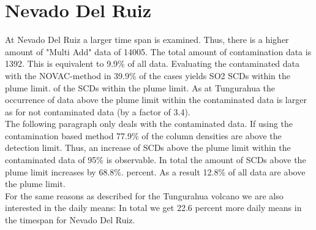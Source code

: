 \documentclass  [
  paper    = a4,
  BCOR     = 10mm,
  twoside,
  fontsize = 12pt,
  fleqn,
  toc      = bibnumbered,
  toc      = listofnumbered,
  numbers  = noendperiod,
  headings = normal,
  listof   = leveldown,
  version  = 3.03
]                                       {scrreprt}
\begin{document}
	


\section{Nevado Del Ruiz}
At Nevado Del Ruiz a larger time span is examined. Thus, there is a higher amount of "Multi Add" data of 14005.
The total amount of contamination data is 1392. This is equivalent to 9.9\% of all data. Evaluating the contaminated data with the NOVAC-method in 39.9\% of the cases yields SO2 SCDs within the plume limit. of the  SCDs within the plume limit. As at Tungurahua the occurrence of data above the plume limit within the contaminated data is larger as for not contaminated data (by a factor of 3.4).\\
The following paragraph only deals with the contaminated data.
If using the contamination based method 77.9\% of the  column densities are above the detection limit. Thus, an increase of  SCDs above the plume limit within the contaminated data of 95\% is observable. In total the amount of  SCDs above the plume limit increases by  68.8\%. percent. As a result 12.8\% of all data are above the plume limit.\\
For the same reasons as described for the Tungurahua volcano we are also interested in the daily means: In total we get 22.6 percent more daily means in the timespan for Nevado Del Ruiz.\\
\\
\FloatBarrier

%
%
%
\end{document}
